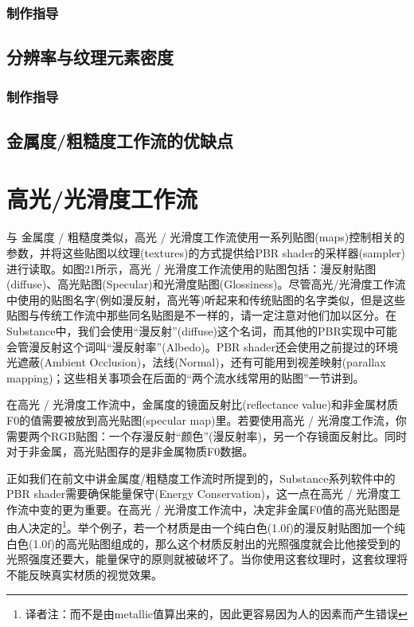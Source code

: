 \subsubsection{制作指导}

\subsection{分辨率与纹理元素密度}

\subsubsection{制作指导}

\subsection{金属度/粗糙度工作流的优缺点}

\section{高光/光滑度工作流}

与 金属度 / 粗糙度类似，高光 / 光滑度工作流使用一系列贴图(maps)控制相关的参数，并将这些贴图以纹理(textures)的方式提供给PBR shader的采样器(sampler)进行读取。如图21所示，高光 / 光滑度工作流使用的贴图包括：漫反射贴图(diffuse)、高光贴图(Specular)和光滑度贴图(Glossiness)。尽管高光/光滑度工作流中使用的贴图名字(例如漫反射，高光等)听起来和传统贴图的名字类似，但是这些贴图与传统工作流中那些同名贴图是不一样的，请一定注意对他们加以区分。在Substance中，我们会使用“漫反射”(diffuse)这个名词，而其他的PBR实现中可能会管漫反射这个词叫“漫反射率”(Albedo)。PBR shader还会使用之前提过的环境光遮蔽(Ambient Occlusion)，法线(Normal)，还有可能用到视差映射(parallax mapping)；这些相关事项会在后面的“两个流水线常用的贴图”一节讲到。

在高光 / 光滑度工作流中，金属度的镜面反射比(reflectance value)和非金属材质F0的值需要被放到高光贴图(specular map)里。若要使用高光 / 光滑度工作流，你需要两个RGB贴图：一个存漫反射“颜色”(漫反射率)，另一个存镜面反射比。同时对于非金属，高光贴图存的是非金属物质F0数据。

正如我们在前文中讲金属度/粗糙度工作流时所提到的，Substance系列软件中的PBR shader需要确保能量保守(Energy Conservation)，这一点在高光 / 光滑度工作流中变的更为重要。在高光 / 光滑度工作流中，决定非金属F0值的高光贴图是由人决定的\footnote{译者注：而不是由metallic值算出来的，因此更容易因为人的因素而产生错误}。举个例子，若一个材质是由一个纯白色(1.0f)的漫反射贴图加一个纯白色(1.0f)的高光贴图组成的，那么这个材质反射出的光照强度就会比他接受到的光照强度还要大，能量保守的原则就被破坏了。当你使用这套纹理时，这套纹理将不能反映真实材质的视觉效果。


